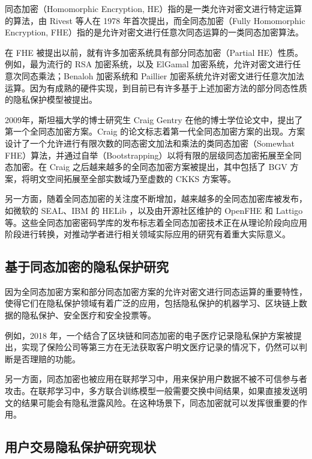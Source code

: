 同态加密（Homomorphic Encryption, HE）指的是一类允许对密文进行特定运算的算法，由 Rivest 等人在 1978 年首次提出\cite{rivest1978data}，而全同态加密（Fully Homomorphic Encryption, FHE）指的是允许对密文进行任意次同态运算的一类同态加密算法。

在 FHE 被提出以前，就有许多加密系统具有部分同态加密（Partial HE）性质。例如，最为流行的 RSA 加密系统，以及 ElGamal 加密系统，允许对密文进行任意次同态乘法\cite{rivest1978method,elgamal1985public}；Benaloh 加密系统和 Paillier 加密系统允许对密文进行任意次加法运算\cite{paillier1999public}。因为有成熟的硬件实现，到目前已有许多基于上述加密方法的部分同态性质的隐私保护模型被提出。

2009年，斯坦福大学的博士研究生 Craig Gentry 在他的博士学位论文中，提出了第一个全同态加密方案\cite{homenc}。Craig 的论文标志着第一代全同态加密方案的出现。方案设计了一个允许进行有限次数的同态密文加法和乘法的类同态加密（Somewhat FHE）算法，并通过自举（Bootstrapping）以将有限的层级同态加密拓展至全同态加密。在 Craig 之后越来越多的全同态加密方案被提出，其中包括了 BGV 方案，将明文空间拓展至全部实数域乃至虚数的 CKKS\cite{cryptoeprint:2016/421} 方案等。

另一方面，随着全同态加密的关注度不断增加，越来越多的全同态加密库被发布，如微软的 SEAL\cite{sealcrypto}、IBM 的 HELib  ，以及由开源社区维护的 OpenFHE\cite{OpenFHE} 和 Lattigo\cite{Mouchet2020LattigoAM} 等。这些全同态加密密码学库的发布标志着全同态加密技术正在从理论阶段向应用阶段进行转换\cite{ZQL-SEAL}，对推动学者进行相关领域实际应用的研究有着重大实际意义。

\subsection{基于同态加密的隐私保护研究}

因为全同态加密方案和部分同态加密方案的允许对密文进行同态运算的重要特性，使得它们在隐私保护领域有着广泛的应用，包括隐私保护的机器学习、区块链上数据的隐私保护、安全医疗和安全投票等。

例如，2018 年，一个结合了区块链和同态加密的电子医疗记录隐私保护方案被提出\cite{Homo_Medi}，实现了保险公司等第三方在无法获取客户明文医疗记录的情况下，仍然可以判断是否理赔的功能。

另一方面，同态加密也被应用在联邦学习中，用来保护用户数据不被不可信参与者攻击。\cite{FL_HE}在联邦学习中，多方联合训练模型一般需要交换中间结果，如果直接发送明文的结果可能会有隐私泄露风险。在这种场景下，同态加密就可以发挥很重要的作用。

\subsection{用户交易隐私保护研究现状}

